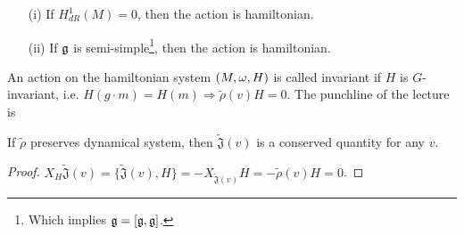  \begin{corollary}
   \begin{itemize}
   \item[(i)] If $H^1_{dR}(M)=0$, then the action is hamiltonian.
   \item[(ii)] If $\mathfrak{g}$ is semi-simple\footnote{Which implies
   $\mathfrak{g}=[\mathfrak{g},\mathfrak{g}]$.}, then the action is hamiltonian.
   \end{itemize}
 \end{corollary}

 An action on the hamiltonian system $(M,\omega,H)$ is called
 invariant if $H$ is $G$-invariant, i.e. $H(g\cdot m)=H(m)
 \Longrightarrow \tilde\rho(v)H=0$.  The punchline of the lecture
 is
 \begin{proposition}
   If $\tilde \rho$ preserves dynamical system, then
   $\tilde{\mathfrak{J}}(v)$ is a conserved quantity for any $v$.
 \end{proposition}
 \begin{proof}
   $X_H\tilde{\mathfrak{J}}(v) = \{\tilde{\mathfrak{J}}(v),H\} =
   -X_{\tilde{\mathfrak{J}}(v)}H = -\tilde\rho(v)H=0$.
 \end{proof}
